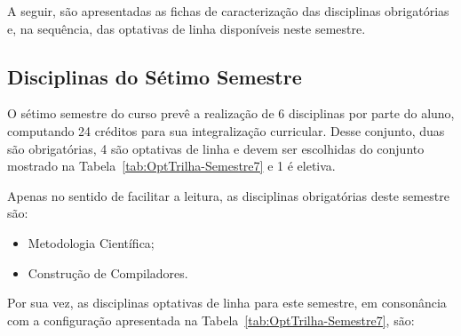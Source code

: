     A seguir, são apresentadas as fichas de caracterização das disciplinas obrigatórias e, na sequência, das optativas de linha disponíveis neste semestre.
    
    
    
     

    
    
    
    
    
    
    
    
    
    
    
    
    
    
    
    
    
    
    
    
   
    
    
    
    \subsection{Disciplinas do Sétimo Semestre}
    
    
    O sétimo semestre do curso prevê a realização de 6 disciplinas por parte do aluno, computando 24 créditos para sua integralização curricular. Desse conjunto, duas são obrigatórias, 4 são optativas de linha e devem ser escolhidas do conjunto mostrado na Tabela~\ref{tab:OptTrilha-Semestre7} e 1 é eletiva. 
    
    Apenas no sentido de facilitar a leitura, as disciplinas obrigatórias deste semestre são: 
    
    
    \begin{itemize}
        \item Metodologia Científica;
        \item Construção de Compiladores.
    \end{itemize}
    
    Por sua vez, as disciplinas optativas de linha para este semestre, em consonância com a configuração apresentada na Tabela~\ref{tab:OptTrilha-Semestre7}, são:
    
